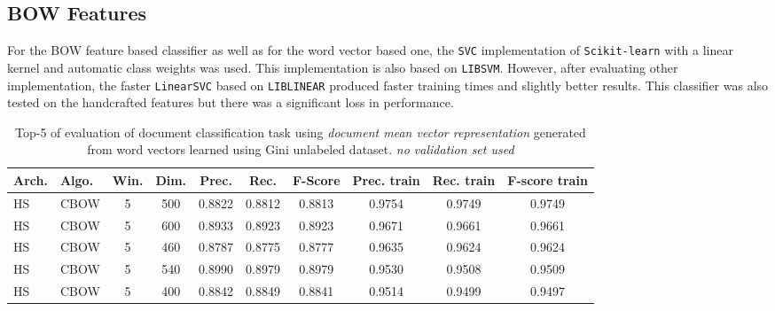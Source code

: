 \subsection{\ac{BOW} Features}

For the \ac{BOW} feature based classifier as well as for the word vector
based one, the  \texttt{SVC} implementation of  \texttt{Scikit-learn}
with a linear kernel and automatic class weights was used. This
implementation is also  based on \texttt{LIBSVM}. However, after evaluating
other implementation, the  faster \texttt{LinearSVC} based on \texttt{LIBLINEAR}
\cite{Fan:2008:LLL:1390681.1442794}  produced faster training times
and slightly better results. This classifier was also tested on the
handcrafted features but there was a significant loss in performance.


\begin{table}[!htbp] 

  \centering
  \caption{Top-5 of evaluation of document classification task using
    \textit{document mean vector representation} generated from word vectors learned
  using Gini unlabeled dataset. \textit{no validation set used}
 }
  \label{tab:w2v4tc_ginig_w2v_evaluation_no_validation}

\small
\begin{tabular}{|llcc|ccc|ccc|}
\hline
 Arch.  &  Algo.  &  Win.  &  Dim.  &  Prec.  &  Rec.  &  F-Score  &  Prec.
 train  &  Rec. train  &  F-score train  \\
\hline
 \ac{HS}       &  \ac{CBOW}  &       5  &   500  &     0.8822  &  0.8812  &    0.8813  &        0.9754  &       0.9749  &          0.9749  \\
 \ac{HS}       &  \ac{CBOW}  &       5  &   600  &     0.8933  &  0.8923  &    0.8923  &        0.9671  &       0.9661  &          0.9661  \\
 \ac{HS}       &  \ac{CBOW}  &       5  &   460  &     0.8787  &  0.8775  &    0.8777  &        0.9635  &       0.9624  &          0.9624  \\
 \ac{HS}       &  \ac{CBOW}  &       5  &   540  &     0.8990  &  0.8979  &    0.8979  &        0.9530  &       0.9508  &          0.9509  \\
 \ac{HS}       &  \ac{CBOW}  &       5  &   400  &     0.8842  &  0.8849  &
 0.8841  &        0.9514  &       0.9499  &          0.9497  \\
\hline
\end{tabular}
\end{table}



